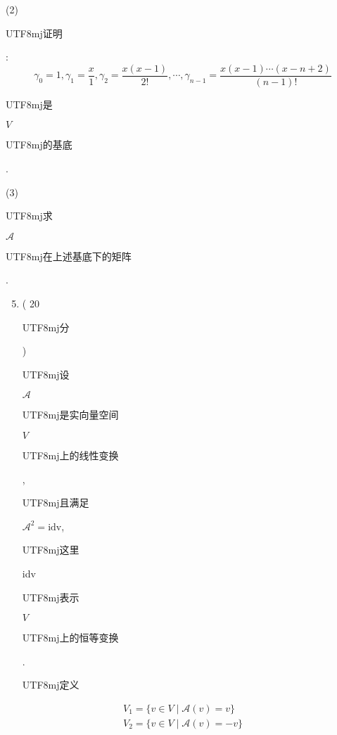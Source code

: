\documentclass[10pt]{article}
\begin{document}
(2) \begin{CJK}{UTF8}{mj}证明\end{CJK}:
$$
\gamma_{0}=1, \gamma_{1}=\frac{x}{1}, \gamma_{2}=\frac{x(x-1)}{2 !}, \cdots, \gamma_{n-1}=\frac{x(x-1) \cdots(x-n+2)}{(n-1) !}
$$
\begin{CJK}{UTF8}{mj}是\end{CJK} $V$ \begin{CJK}{UTF8}{mj}的基底\end{CJK}.

(3) \begin{CJK}{UTF8}{mj}求\end{CJK} $\mathscr{A}$ \begin{CJK}{UTF8}{mj}在上述基底下的矩阵\end{CJK}.

\begin{enumerate}
  \setcounter{enumi}{4}
  \item ( 20 \begin{CJK}{UTF8}{mj}分\end{CJK}) \begin{CJK}{UTF8}{mj}设\end{CJK} $\mathscr{A}$ \begin{CJK}{UTF8}{mj}是实向量空间\end{CJK} $V$ \begin{CJK}{UTF8}{mj}上的线性变换\end{CJK}, \begin{CJK}{UTF8}{mj}且满足\end{CJK} $\mathscr{A}^{2}=\mathrm{idv}$, \begin{CJK}{UTF8}{mj}这里\end{CJK} idv \begin{CJK}{UTF8}{mj}表示\end{CJK} $V$ \begin{CJK}{UTF8}{mj}上的恒等变换\end{CJK}. \begin{CJK}{UTF8}{mj}定义\end{CJK}
\end{enumerate}
$$
\begin{gathered}
V_{1}=\{v \in V \mid \mathscr{A}(v)=v\} \\
V_{2}=\{v \in V \mid \mathscr{A}(v)=-v\}
\end{gathered}
$$
\end{document}
